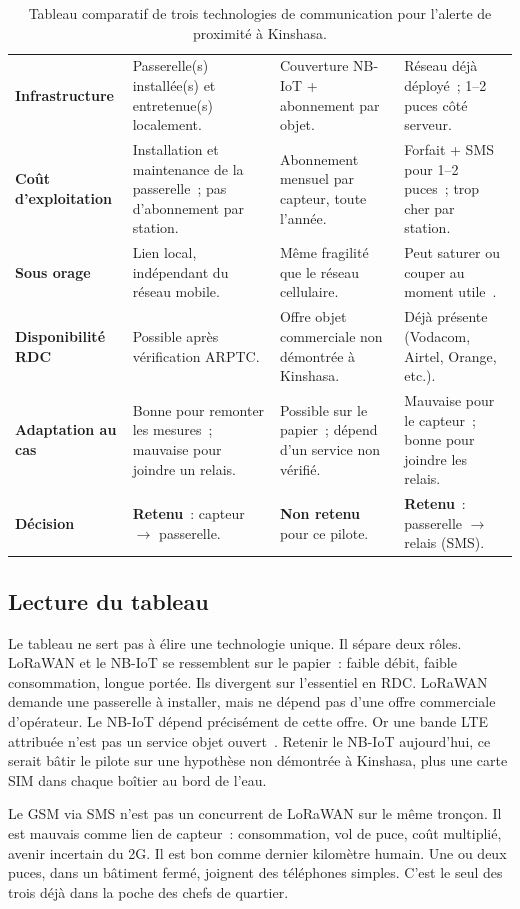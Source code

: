 \documentclass[12pt,a4paper]{article}
\begin{document}
\begin{table}[H]
\begin{tabularx}{\textwidth}{@{}>{\raggedright\arraybackslash\bfseries}p{2.85cm}>{\raggedright\arraybackslash}X>{\raggedright\arraybackslash}X>{\raggedright\arraybackslash}X@{}}
\addlinespace
Infrastructure & Passerelle(s) installée(s) et entretenue(s) localement. & Couverture NB-IoT + abonnement par objet. & Réseau déjà déployé~; 1--2 puces côté serveur. \\
\addlinespace
Coût d'exploitation & Installation et maintenance de la passerelle~; pas d'abonnement par station. & Abonnement mensuel par capteur, toute l'année. & Forfait + SMS pour 1--2 puces~; trop cher par station. \\
\addlinespace
Sous orage & Lien local, indépendant du réseau mobile. & Même fragilité que le réseau cellulaire. & Peut saturer ou couper au moment utile~\cite{ifrc2025}. \\
\addlinespace
Disponibilité RDC & Possible après vérification ARPTC. & Offre objet commerciale non démontrée à Kinshasa. & Déjà présente (Vodacom, Airtel, Orange, etc.). \\
\addlinespace
Adaptation au cas & Bonne pour remonter les mesures~; mauvaise pour joindre un relais. & Possible sur le papier~; dépend d'un service non vérifié. & Mauvaise pour le capteur~; bonne pour joindre les relais. \\
\addlinespace
Décision & \textbf{Retenu}~: capteur $\rightarrow$ passerelle. & \textbf{Non retenu} pour ce pilote. & \textbf{Retenu}~: passerelle $\rightarrow$ relais (SMS). \\
\bottomrule
\end{tabularx}
\caption{Tableau comparatif de trois technologies de communication pour l'alerte de proximité à Kinshasa.}
\label{tab:tech}
\end{table}

\subsection{Lecture du tableau}

Le tableau ne sert pas à élire une technologie unique. Il sépare deux rôles. LoRaWAN et le NB-IoT se ressemblent sur le papier~: faible débit, faible consommation, longue portée. Ils divergent sur l'essentiel en RDC. LoRaWAN demande une passerelle à installer, mais ne dépend pas d'une offre commerciale d'opérateur. Le NB-IoT dépend précisément de cette offre. Or une bande LTE attribuée n'est pas un service objet ouvert~\cite{arptc2025}. Retenir le NB-IoT aujourd'hui, ce serait bâtir le pilote sur une hypothèse non démontrée à Kinshasa, plus une carte SIM dans chaque boîtier au bord de l'eau.

Le GSM via SMS n'est pas un concurrent de LoRaWAN sur le même tronçon. Il est mauvais comme lien de capteur~: consommation, vol de puce, coût multiplié, avenir incertain du 2G. Il est bon comme dernier kilomètre humain. Une ou deux puces, dans un bâtiment fermé, joignent des téléphones simples. C'est le seul des trois déjà dans la poche des chefs de quartier.
\end{document}
